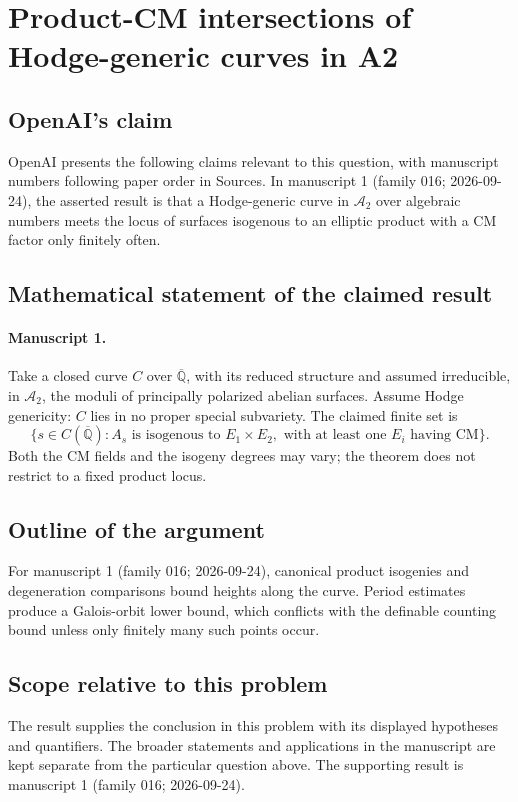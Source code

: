 \documentclass[11pt]{article}
\begin{document}
\section*{Product-CM intersections of Hodge-generic curves in A2}

\subsection{OpenAI's claim}
OpenAI presents the following claims relevant to this question, with manuscript numbers following paper order in Sources. In manuscript 1 (family 016; 2026-09-24), the asserted result is that a Hodge-generic curve in $\mathcal A_2$ over algebraic numbers meets the locus of surfaces isogenous to an elliptic product with a CM factor only finitely often.

\subsection{Mathematical statement of the claimed result}
\paragraph{Manuscript 1.}
Take a closed curve $C$ over $\overline{\mathbb Q}$, with its reduced structure and assumed irreducible, in $\mathcal A_2$, the moduli of principally polarized abelian surfaces. Assume Hodge genericity: $C$ lies in no proper special subvariety. The claimed finite set is
\[
 \{s\in C(\overline{\mathbb Q}):A_s\text{ is isogenous to }E_1\times E_2,
 \text{ with at least one }E_i\text{ having CM}\}.
\]
Both the CM fields and the isogeny degrees may vary; the theorem does not restrict to a fixed product locus.

\subsection{Outline of the argument}
For manuscript 1 (family 016; 2026-09-24), canonical product isogenies and degeneration comparisons bound heights along the curve. Period estimates produce a Galois-orbit lower bound, which conflicts with the definable counting bound unless only finitely many such points occur.

\subsection{Scope relative to this problem}
The result supplies the conclusion in this problem with its displayed hypotheses and quantifiers. The broader statements and applications in the manuscript are kept separate from the particular question above. The supporting result is manuscript 1 (family 016; 2026-09-24).
\end{document}

